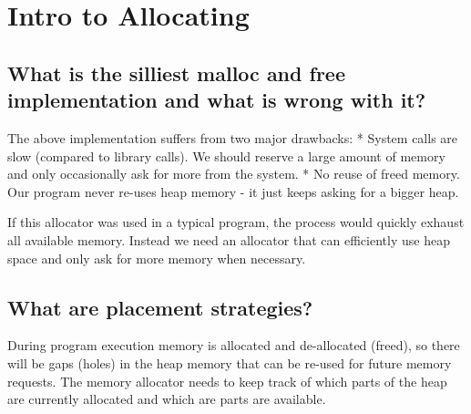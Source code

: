 \section{Intro to Allocating}\label{intro-to-allocating}

\subsection{What is the silliest malloc and free implementation and what
is wrong with
it?}\label{what-is-the-silliest-malloc-and-free-implementation-and-what-is-wrong-with-it}

\begin{Shaded}
\begin{Highlighting}[]
    
    \NormalTok{*) -}\NormalTok{) } 
    
\NormalTok{\}}
 \NormalTok{\}}
\end{Highlighting}
\end{Shaded}

The above implementation suffers from two major drawbacks: * System
calls are slow (compared to library calls). We should reserve a large
amount of memory and only occasionally ask for more from the system. *
No reuse of freed memory. Our program never re-uses heap memory - it
just keeps asking for a bigger heap.

If this allocator was used in a typical program, the process would
quickly exhaust all available memory. Instead we need an allocator that
can efficiently use heap space and only ask for more memory when
necessary.

\subsection{What are placement
strategies?}\label{what-are-placement-strategies}

During program execution memory is allocated and de-allocated (freed),
so there will be gaps (holes) in the heap memory that can be re-used for
future memory requests. The memory allocator needs to keep track of
which parts of the heap are currently allocated and which are parts are
available.

